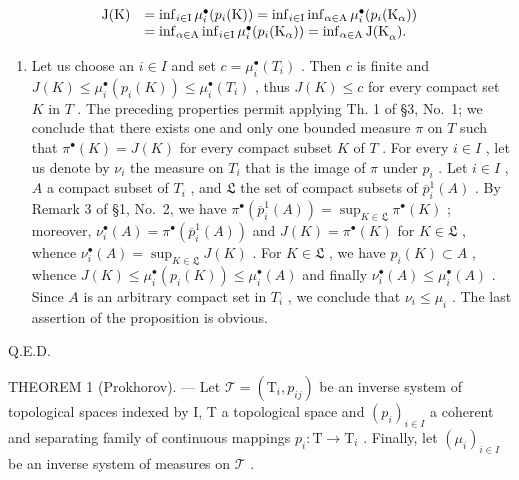 \[
\begin{array}{r l} \mathrm{J(K)} & = \inf _ {i \in \mathrm{I}} \mu_ {i} ^ {\bullet} (p _ {i} (\mathrm{K})) = \inf _ {i \in \mathrm{I}} \inf _ {\alpha \in \mathrm{A}} \mu_ {i} ^ {\bullet} (p _ {i} (\mathrm{K} _ {\alpha})) \\ & = \inf _ {\alpha \in \mathrm{A}} \inf _ {i \in \mathrm{I}} \mu_ {i} ^ {\bullet} (p _ {i} (\mathrm{K} _ {\alpha})) = \inf _ {\alpha \in \mathrm{A}} \mathrm{J(K} _ {\alpha}). \end{array}
\]

\begin{enumerate}
\def\labelenumi{\arabic{enumi})}
\setcounter{enumi}{4}
\tightlist
\item
  Let us choose an \(i \in I\) and set \(c = \mu_i^\bullet(T_i)\) . Then \(c\) is finite and \(J(K) \leqslant \mu_i^\bullet(p_i(K)) \leqslant \mu_i^\bullet(T_i)\) , thus \(J(K) \leqslant c\) for every compact set \(K\) in \(T\) . The preceding properties permit applying Th. 1 of §3, No.~1; we conclude that there exists one and only one bounded measure \(\pi\) on \(T\) such that \(\pi^\bullet(K) = J(K)\) for every compact subset \(K\) of \(T\) . For every \(i \in I\) , let us denote by \(\nu_i\) the measure on \(T_i\) that is the image of \(\pi\) under \(p_i\) . Let \(i \in I\) , \(A\) a compact subset of \(T_i\) , and \(\mathfrak{L}\) the set of compact subsets of \(\overline{p}_i^1(A)\) . By Remark 3 of §1, No.~2, we have \(\pi^\bullet(\overline{p}_i^1(A)) = \sup_{K \in \mathfrak{L}} \pi^\bullet(K)\) ; moreover, \(\nu_i^\bullet(A) = \pi^\bullet(\overline{p}_i^1(A))\) and \(J(K) = \pi^\bullet(K)\) for \(K \in \mathfrak{L}\) , whence \(\nu_i^\bullet(A) = \sup_{K \in \mathfrak{L}} J(K)\) . For \(K \in \mathfrak{L}\) , we have \(p_i(K) \subset A\) , whence \(J(K) \leqslant \mu_i^\bullet(p_i(K)) \leqslant \mu_i^\bullet(A)\) and finally \(\nu_i^\bullet(A) \leqslant \mu_i^\bullet(A)\) . Since \(A\) is an arbitrary compact set in \(T_i\) , we conclude that \(\nu_i \leqslant \mu_i\) . The last assertion of the proposition is obvious.
\end{enumerate}

Q.E.D.

THEOREM 1 (Prokhorov). --- Let \(\mathcal{T} = (\mathrm{T}_{i}, p_{ij})\) be an inverse system of topological spaces indexed by I, T a topological space and \((p_{i})_{i \in I}\) a coherent and separating family of continuous mappings \(p_{i}: \mathrm{T} \to \mathrm{T}_{i}\) . Finally, let \((\mu_{i})_{i \in I}\) be an inverse system of measures on \(\mathcal{T}\) .


